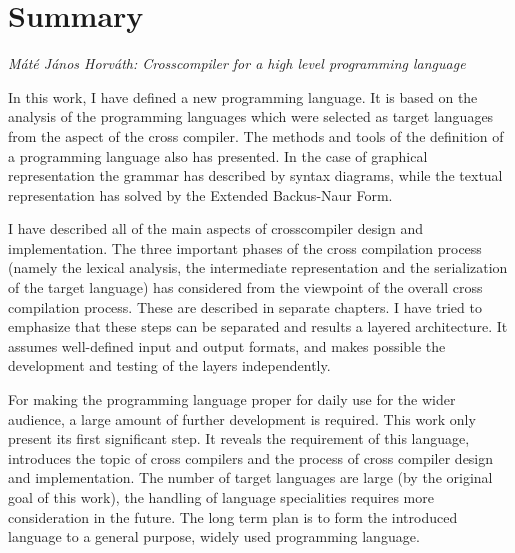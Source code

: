 \documentclass[a4paper,12pt]{article}
\begin{document}
\pagestyle{empty}

\section*{Summary}

\textit{Máté János Horváth: Crosscompiler for a high level programming language}

\bigskip

In this work, I have defined a new programming language. It is based on the analysis of the programming languages which were selected as target languages from the aspect of the cross compiler. The methods and tools of the definition of a programming language also has presented. In the case of graphical representation the grammar has described by syntax diagrams, while the textual representation has solved by the Extended Backus-Naur Form.

I have described all of the main aspects of crosscompiler design and implementation. The three important phases of the cross compilation process (namely the lexical analysis, the intermediate representation and the serialization of the target language) has considered from the viewpoint of the overall cross compilation process. These are described in separate chapters. I have tried to emphasize that these steps can be separated and results a layered architecture. It assumes well-defined input and output formats, and makes possible the development and testing of the layers independently.

For making the programming language proper for daily use for the wider audience, a large amount of further development is required. This work only present its first significant step. It reveals the requirement of this language, introduces the topic of cross compilers and the process of cross compiler design and implementation. The number of target languages are large (by the original goal of this work), the handling of language specialities requires more consideration in the future. The long term plan is to form the introduced language to a general purpose, widely used programming language.
\end{document}
